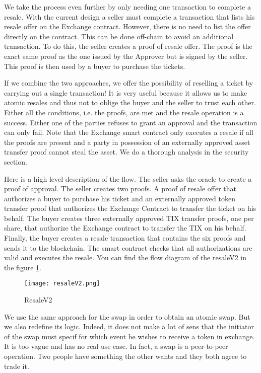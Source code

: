 \documentclass[a4paper,11pt,oneside]{report}
\begin{document}
We take the process even further by only needing one transaction to complete a resale. With the current design a seller must complete a transaction that lists his resale offer on the Exchange contract. However, there is no need to list the offer directly on the contract. This can be done off-chain to avoid an additional transaction. To do this, the seller creates a proof of resale offer. The proof is the exact same proof as the one issued by the Approver but is signed by the seller. This proof is then used by a buyer to purchase the tickets.

If we combine the two approaches, we offer the possibility of reselling a ticket by carrying out a single transaction! It is very useful because it allows us to make atomic resales and thus not to oblige the buyer and the seller to trust each other. Either all the conditions, i.e. the proofs, are met and the resale operation is a success. Either one of the parties refuses to grant an approval and the transaction can only fail. Note that the Exchange smart contract only executes a resale if all the proofs are present and a party in possession of an externally approved asset transfer proof cannot steal the asset. We do a thorough analysis in the security section.

Here is a high level description of the flow. The seller asks the oracle to create a proof of approval. The seller creates two proofs. A proof of resale offer that authorizes a buyer to purchase his ticket and an externally approved token transfer proof that authorizes the Exchange Contract to transfer the ticket on his behalf. The buyer creates three externally approved TIX transfer proofs, one per share, that authorize the Exchange contract to transfer the TIX on his behalf. Finally, the buyer creates a resale transaction that contains the six proofs and sends it to the blockchain. The smart contract checks that all authorizations are valid and executes the resale. You can find the flow diagram of the resaleV2 in the figure
\hyperref[fig:resaleV2]{\ref{fig:resaleV2}}.

\begin{figure}[h!]
  \texttt{[image: resaleV2.png]}
  \caption{ResaleV2}
  \label{fig:resaleV2}
\end{figure}

We use the same approach for the swap in order to obtain an atomic swap. But we also redefine its logic. Indeed, it does not make a lot of sens that the initiator of the swap must specif for which event he wishes to receive a token in exchange. It is too vague and has no real use case. In fact, a swap is a peer-to-peer operation. Two people have something the other wants and they both agree to trade it. 
\end{document}
